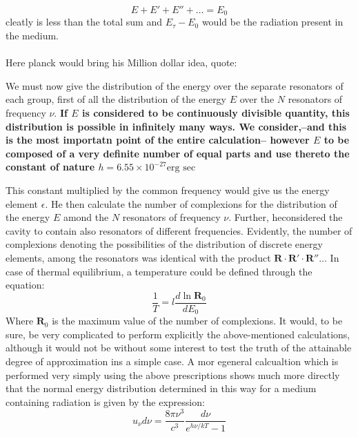\documentclass[9pt,a4paper, twocolumn]{article}
\begin{document}
            \begin{equation}
                E+E'+E'' +\dots = E_0
            \end{equation}
            cleatly is less than the total sum and $E_\tau -E_0$ would be the radiation present in the medium. 
            \\
            \\
            Here planck would bring his Million dollar idea, quote:
            \begin{qt}
                We must now give the distribution of the energy over the separate resonators of each group, first of all the distribution of the energy $E$ over the $N$ resonators of frequency $\nu$. \textbf{If $E$ is considered to be continuously divisible quantity, this distribution is possible in infinitely many ways. We consider,--and this is the most importatn point of the entire calculation-- however $E$ to be composed of a very definite number of equal parts and use thereto the constant of nature $h = 6.55\times 10^{-27} \text{erg sec}$}
            \end{qt}
            This constant multiplied by the common frequency would give us the energy element $\epsilon$. He then calculate the number of complexions for the distribution  of the energy $E$ amond the $N$ resonators of frequency $\nu$. Further, heconsidered the cavity to contain also resonators of different frequencies. Evidently, the number of complexions denoting the possibilities of the distribution of discrete energy elements, among the resonators was identical with the product $\textbf{R}\cdot \textbf{R}'\cdot\textbf{R}''\dots$ In case of thermal equilibrium, a temperature could be defined through the equation:
            \begin{equation}
                \frac1T = l\frac{d\ln \textbf{R}_0}{dE_0}
            \end{equation}
            Where $\textbf{R}_0$ is the maximum value of the number of complexions. It would, to be sure, be very complicated to perform explicitly the above-mentioned calculations, although it would not be without some interest to test the truth of the attainable degree of approximation ins a simple case. A mor egeneral calcualtion which is performed very simply using the above prescriptions shows much more directly that the normal energy distribution determined in this way for a medium containing radiation is given by the expression:
            \begin{equation}
                u_\nu d\nu = \frac{8\pi\nu^3}{c^3}\frac{d\nu}{e^{h\nu/kT}-1}
            \end{equation}
\end{document}
